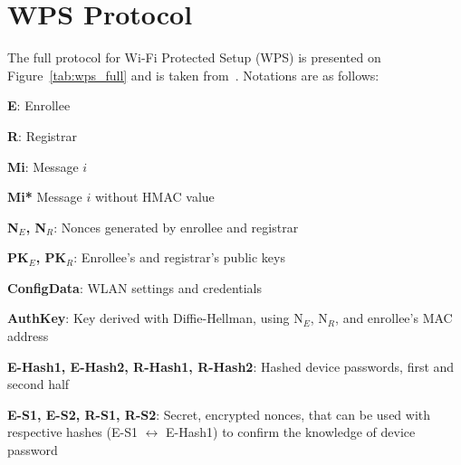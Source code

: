 \documentclass[12pt,a4paper,oneside,pdftex]{report}
\begin{document}
% 



\appendix
\chapter{WPS Protocol}
\label{chapter:appendix:wps}

The full protocol for Wi-Fi Protected Setup (WPS) is presented on Figure~\ref{tab:wps_full} and is taken from~\cite{microsoftWCN}. Notations are as follows:

\textbf{E}: Enrollee

\textbf{R}: Registrar

\textbf{Mi}: Message $i$

\textbf{Mi*} Message $i$ without HMAC value

\textbf{N$_E$, N$_R$}: Nonces generated by enrollee and registrar

\textbf{PK$_E$, PK$_R$}: Enrollee's and registrar's public keys

\textbf{ConfigData}: WLAN settings and credentials

\textbf{AuthKey}: Key derived with Diffie-Hellman, using N$_E$, N$_R$, and enrollee's MAC address

\textbf{E-Hash1, E-Hash2, R-Hash1, R-Hash2}: Hashed device passwords, first and second half

\textbf{E-S1, E-S2, R-S1, R-S2}: Secret, encrypted nonces, that can be used with respective hashes (E-S1 $\leftrightarrow$ E-Hash1) to confirm the knowledge of device password
\end{document}
